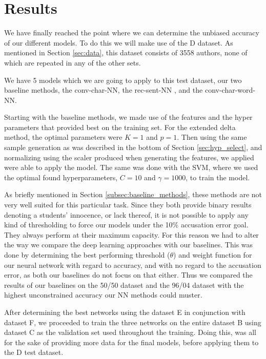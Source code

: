 \section{Results} \label{sec:results}

We have finally reached the point where we can determine the unbiased accuracy
of our different models. To do this we will make use of the \gls{D} dataset. As
mentioned in Section \ref{sec:data}, this dataset consists of 3558 authors, none
of which are repeated in any of the other sets.

We have 5 models which we are going to apply to this test dataset, our
two baseline methods, the \gls{conv-char-NN}, the \gls{rec-sent-NN} , and the
\gls{conv-char-word-NN}.

Starting with the baseline methods, we made use of the features and the
hyper parameters that provided best on the training set. For the extended
delta method, the optimal parameters were $K=1$ and $p = 1$. Then using
the same sample generation as was described in the bottom of Section
\ref{sec:hyp_select}, and normalizing using the scaler produced when generating
the features, we applied were able to apply the model. The same was done with
the \gls{SVM}, where we used the optimal found hyperparameters, $C=10$ and
$\gamma = 1000$, to train the model.

As briefly mentioned in Section \ref{subsec:baseline_methods}, these methods are
not very well suited for this particular task. Since they both provide binary
results denoting a students' innocence, or lack thereof, it is not possible to
apply any kind of thresholding to force our models under the 10\% accusation
error goal. They always perform at their maximum capacity. For this reason we
had to alter the way we compare the deep learning approaches with our baselines.
This was done by determining the best performing threshold ($\theta$) and weight
function for our neural network with regard to accuracy, and with no regard to
the accusation error, as both our baselines do not focus on that either. Thus we
compared the results of our baselines on the 50/50 dataset and the 96/04 dataset
with the highest unconstrained accuracy our \gls{NN} methods could muster.

After determining the best networks using the dataset \gls{E} in conjunction
with dataset \gls{F}, we proceeded to train the three networks on the entire
dataset \gls{B} using dataset \gls{C} as the validation set used throughout the
training. Doing this, was all for the sake of providing more data for the final
models, before applying them to the \gls{D} test dataset.

